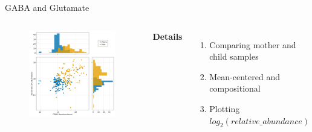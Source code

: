 
\begin{frame}{GABA and Glutamate}
    \begin{columns}[c] %

    
        \begin{figure}
        \includegraphics[width=1\linewidth]{../figures/gaba-glutamate.png}
        \end{figure}

    
        \textbf{Details}
        \begin{enumerate}
            \item Comparing mother and child samples
            \item Mean-centered and compositional
            \item Plotting $log_2(relative\_abundance)$
        \end{enumerate}

    \end{columns}

\end{frame}

